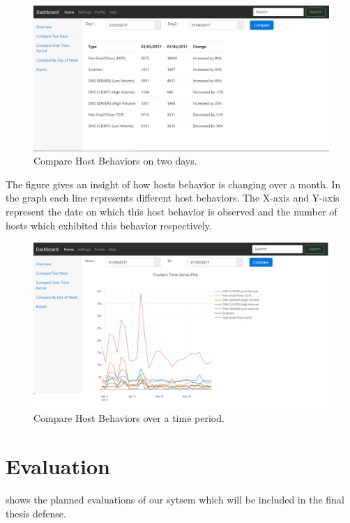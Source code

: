 \begin{figure}[t]
	\centerline{\includegraphics[scale = 0.45]{tool_compare_days.png}}
	\caption{Compare Host Behaviors on two days.}%
\end{figure} 

The figure  gives an insight of how hosts behavior is changing over a month.
In the graph each line represents different host behaviors. The X-axis and Y-axis
represent the date on which this host behavior is observed and the number of hosts
which exhibited this behavior respectively.

\begin{figure}[t]
	\centerline{\includegraphics[scale = 0.45]{tool_compare_week.png}}
	\caption{Compare Host Behaviors over a time period.}%
\end{figure} 



\section{Evaluation}

 shows the planned evaluations of our sytsem which will be included in the final thesis defense.

